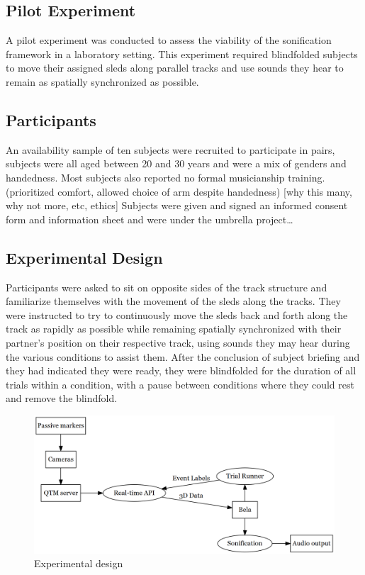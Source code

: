 \documentclass[10pt,a4paper,onecolumn]{article}
\begin{document}
\hypertarget{pilot-experiment}{%
\subsection{Pilot Experiment}\label{pilot-experiment}}

A pilot experiment was conducted to assess the viability of the sonification framework in a laboratory setting. This experiment required blindfolded subjects to move their assigned sleds along parallel tracks and use sounds they hear to remain as spatially synchronized as possible.

\hypertarget{participants}{%
\subsection{Participants}\label{participants}}

An availability sample of ten subjects were recruited to participate in pairs, subjects were all aged between 20 and 30 years and were a mix of genders and handedness. Most subjects also reported no formal musicianship training. (prioritized comfort, allowed choice of arm despite handedness) {[}why this many, why not more, etc, ethics{]} Subjects were given and signed an informed consent form and information sheet and were under the umbrella project\ldots{}

\hypertarget{experimental-design}{%
\subsection{Experimental Design}\label{experimental-design}}

Participants were asked to sit on opposite sides of the track structure and familiarize themselves with the movement of the sleds along the tracks. They were instructed to try to continuously move the sleds back and forth along the track as rapidly as possible while remaining spatially synchronized with their partner's position on their respective track, using sounds they may hear during the various conditions to assist them. After the conclusion of subject briefing and they had indicated they were ready, they were blindfolded for the duration of all trials within a condition, with a pause between conditions where they could rest and remove the blindfold.

\begin{figure}

{\centering \includegraphics[width=1\linewidth]{figures/exp-graph} 

}

\caption{Experimental design}\label{fig:exp-graph}
\end{figure}
\end{document}

